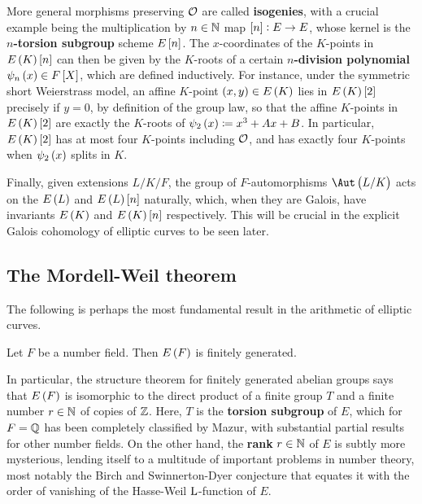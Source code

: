 More general morphisms preserving $ \mathcal{O} $ are called \textbf{isogenies}, with a crucial example being the multiplication by $ n \in \mathbb{N} $ map $ \sbr{n} : E \to E $, whose kernel is the \textbf{$ n $-torsion subgroup} scheme $ E\sbr{n} $. The $ x $-coordinates of the $ K $-points in $ E\br{K}\sbr{n} $ can then be given by the $ K $-roots of a certain \textbf{$ n $-division polynomial} $ \psi_n\br{x} \in F\sbr{X} $, which are defined inductively. For instance, under the symmetric short Weierstrass model, an affine $ K $-point $ \br{x, y} \in E\br{K} $ lies in $ E\br{K}\sbr{2} $ precisely if $ y = 0 $, by definition of the group law, so that the affine $ K $-points in $ E\br{K}\sbr{2} $ are exactly the $ K $-roots of $ \psi_2\br{x} \coloneqq x^3 + Ax + B $. In particular, $ E\br{K}\sbr{2} $ has at most four $ K $-points including $ \mathcal{O} $, and has exactly four $ K $-points when $ \psi_2\br{x} $ splits in $ K $.

Finally, given extensions $ L / K / F $, the group of $ F $-automorphisms $ \Aut\br{L / K} $ acts on the $ E\br{L} $ and $ E\br{L}\sbr{n} $ naturally, which, when they are Galois, have invariants $ E\br{K} $ and $ E\br{K}\sbr{n} $ respectively. This will be crucial in the explicit Galois cohomology of elliptic curves to be seen later.

\subsection{The Mordell-Weil theorem}

The following is perhaps the most fundamental result in the arithmetic of elliptic curves.

\begin{theorem}
\label{thm:mordellweil}
Let $ F $ be a number field. Then $ E\br{F} $ is finitely generated.
\end{theorem}

In particular, the structure theorem for finitely generated abelian groups says that $ E\br{F} $ is isomorphic to the direct product of a finite group $ T $ and a finite number $ r \in \mathbb{N} $ of copies of $ \mathbb{Z} $. Here, $ T $ is the \textbf{torsion subgroup} of $ E $, which for $ F = \mathbb{Q} $ has been completely classified by Mazur, with substantial partial results for other number fields. On the other hand, the \textbf{rank} $ r \in \mathbb{N} $ of $ E $ is subtly more mysterious, lending itself to a multitude of important problems in number theory, most notably the Birch and Swinnerton-Dyer conjecture that equates it with the order of vanishing of the Hasse-Weil $ \mathrm{L} $-function of $ E $.

